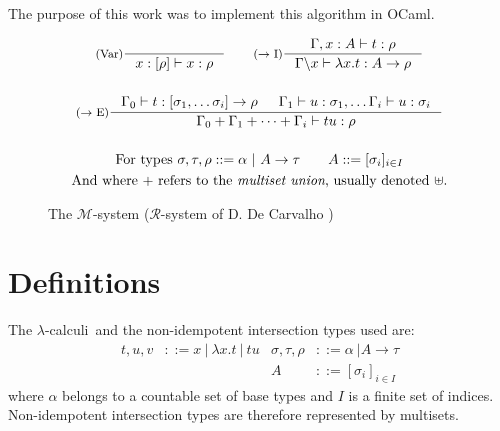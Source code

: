\documentclass{article}
\newtheorem{Def}{Definition}
\def\lci{$\lambda$-calculi}
\begin{document}
The purpose of this work was to implement this algorithm in OCaml.

\begin{figure}[h]
    \begin{mdframed}
        \begin{gather*}
        \inference[(Var)]{}{x : [\rho] \vdash x : \rho}
        \qquad
        \inference[($\rightarrow$ I)]{\Gamma, x : A \vdash t : \rho}{\Gamma \backslash x \vdash \lambda x.t : A \rightarrow \rho}
        \\ \\
        \inference[($\rightarrow$ E)]{\Gamma_0 \vdash t : [\sigma_1, \ldots \sigma_i] \rightarrow \rho 
            & \Gamma_1 \vdash u : \sigma_1, \ldots \Gamma_i \vdash u : \sigma_i}
        {\Gamma_0 + \Gamma_1 + \cdots + \Gamma_i \vdash tu : \rho}
        \\ \\
        \text{For types } \sigma, \tau, \rho ::= \alpha \ | \ A \rightarrow \tau \qquad A ::= [\sigma_i]_{i \in I}
        \\ \text{And where $+$ refers to the \emph{multiset union}, usually denoted $\uplus$.}
        \end{gather*}
    \end{mdframed}
    \caption{The  $\mathcal{M}$-system ($\mathcal{R}$-system of D. De Carvalho \cite{DeCarvalho})}
\end{figure}


\section {Definitions}
The \lci\ and the non-idempotent intersection types used are:
\begin{align*}
	t, u, v &::= x\ |\ \lambda x.t\ |\ tu 
	& \sigma, \tau, \rho &::= \alpha \ | A \rightarrow \tau \\
	&& A &::= [\sigma_i]_{i \in I}
\end{align*}
where $\alpha$ belongs to a countable set of base types and $I$ is a finite set of indices. Non-idempotent intersection types are therefore represented by multisets.
\end{document}
